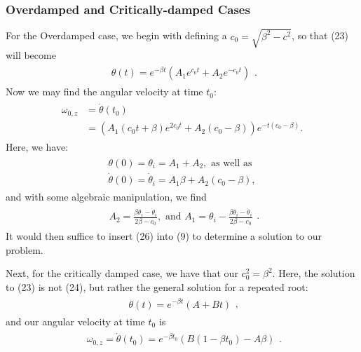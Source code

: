     \subsubsection{Overdamped and Critically-damped Cases}
    For the Overdamped case, we begin with defining a $c_{0}=\sqrt{\beta^{2}-c^{2}}$, so that (23) will become
    \begin{eqnarray}
    \begin{split}
        \theta(t)=e^{-\beta t}(A_{1}e^{c_{0}t}+A_{2}e^{-c_{0}t})
    \end{split}.
    \end{eqnarray}
    Now we may find the angular velocity at time $t_{0}$:
    \begin{eqnarray}
    \begin{split}
        \omega_{0,z} & =\dot\theta(t_{0})\\
        & =(A_{1}(c_{0}t+\beta)e^{2c_{0}t}+A_{2}(c_{0}-\beta))e^{-t(c_{0}-\beta)}.
    \end{split}
    \end{eqnarray}
    Here, we have:
    \begin{eqnarray}
    \begin{split}
        \theta(0)=\theta_{i}=A_{1}+A_{2}, \text{ as well as }\\ \dot\theta(0)=\dot\theta_{i}=A_{1}\beta+A_{2}(c_{0}-\beta),
    \end{split}
    \end{eqnarray}
    and with some algebraic manipulation, we find
    \begin{eqnarray}
    \begin{split}
        A_{2}=\frac{\beta\theta_{i}-\dot\theta_{i}}{2\beta-c_{0}}, \text{ and }
        A_{1}=\theta_{i}-\frac{\beta\theta_{i}-\dot\theta_{i}}{2\beta-c_{0}}
    \end{split}.
    \end{eqnarray}
    It would then suffice to insert (26) into (9) to determine a solution to our problem.\par
    Next, for the critically damped case, we have that our $c_{0}^{2}=\beta^{2}$. Here, the solution to (23) is not (24), but rather the general solution for a repeated root:
    \begin{eqnarray}
    \begin{split}
        \theta(t)=e^{-\beta t}(A+Bt)
    \end{split},
    \end{eqnarray}
    and our angular velocity at time $t_{0}$ is
    \begin{eqnarray}
    \begin{split}
        \omega_{0,z}=\dot\theta(t_{0})=e^{-\beta t_{0}}(B(1-\beta t_{0})-A\beta)
    \end{split}.
    \end{eqnarray}
